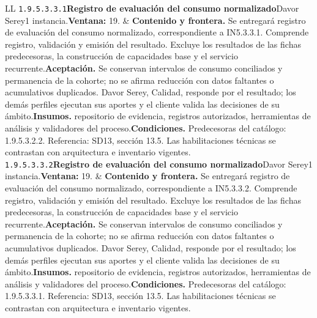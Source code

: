 \begin{longtable}{L{\tabcolsep\relax}L{\tabcolsep\relax}}
\texttt{1.\allowbreak{}9.\allowbreak{}5.\allowbreak{}3.\allowbreak{}3.\allowbreak{}1}\newline{}\textbf{Registro de evaluación del consumo normalizado}\newline{}Davor Serey\newline{}1 instancia.\newline{}\textbf{Ventana:} 19. & \textbf{Contenido y frontera.} Se entregará registro de evaluación del consumo normalizado, correspondiente a IN5.3.3.1. Comprende registro, validación y emisión del resultado. Excluye los resultados de las fichas predecesoras, la construcción de capacidades base y el servicio recurrente.\newline{}\textbf{Aceptación.} Se conservan intervalos de consumo conciliados y permanencia de la cohorte; no se afirma reducción con datos faltantes o acumulativos duplicados. Davor Serey, Calidad, responde por el resultado; los demás perfiles ejecutan sus aportes y el cliente valida las decisiones de su ámbito.\newline{}\textbf{Insumos.} repositorio de evidencia, registros autorizados, herramientas de análisis y validadores del proceso.\newline{}\textbf{Condiciones.} Predecesoras del catálogo: 1.9.5.3.2.2. Referencia: SD13, sección 13.5. Las habilitaciones técnicas se contrastan con arquitectura e inventario vigentes.\\\hline
\texttt{1.\allowbreak{}9.\allowbreak{}5.\allowbreak{}3.\allowbreak{}3.\allowbreak{}2}\newline{}\textbf{Registro de evaluación del consumo normalizado}\newline{}Davor Serey\newline{}1 instancia.\newline{}\textbf{Ventana:} 19. & \textbf{Contenido y frontera.} Se entregará registro de evaluación del consumo normalizado, correspondiente a IN5.3.3.2. Comprende registro, validación y emisión del resultado. Excluye los resultados de las fichas predecesoras, la construcción de capacidades base y el servicio recurrente.\newline{}\textbf{Aceptación.} Se conservan intervalos de consumo conciliados y permanencia de la cohorte; no se afirma reducción con datos faltantes o acumulativos duplicados. Davor Serey, Calidad, responde por el resultado; los demás perfiles ejecutan sus aportes y el cliente valida las decisiones de su ámbito.\newline{}\textbf{Insumos.} repositorio de evidencia, registros autorizados, herramientas de análisis y validadores del proceso.\newline{}\textbf{Condiciones.} Predecesoras del catálogo: 1.9.5.3.3.1. Referencia: SD13, sección 13.5. Las habilitaciones técnicas se contrastan con arquitectura e inventario vigentes.\\\hline

\end{longtable}
